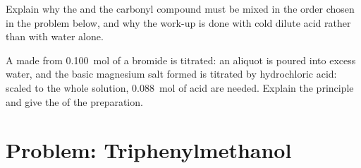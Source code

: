 \begin{exercise}[$\star\star\star$]\label{exo:b1:organomagnesium:11}
Explain why the  and the carbonyl compound must be mixed
in the order chosen in the problem below, and why the work-up is done
with cold dilute acid rather than with water alone.
\end{exercise}

\begin{exercise}[$\star\star\star$]\label{exo:b1:organomagnesium:12}
A  made from \qty{0.100}{mol} of a bromide is titrated:
an aliquot is poured into excess water, and the basic magnesium salt
formed is titrated by hydrochloric acid: scaled to the whole solution,
\qty{0.088}{mol} of acid are needed. Explain the principle and give the  of the
preparation.
\end{exercise}

\section{Problem: Triphenylmethanol}

